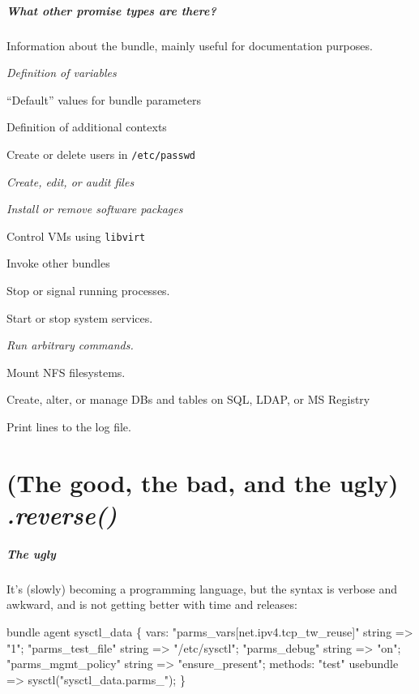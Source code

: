 \documentclass[english,serif,mathserif,usenames,dvipsnames]{beamer}
\begin{document}
\begin{frame}
  \frametitle{What other promise types are there?}
  \begin{description}
    \small
    \item[meta] Information about the bundle, mainly useful for documentation purposes.
    \item[vars] \emph{Definition of variables}
    \item[defaults] ``Default'' values for bundle parameters
    \item[classes] Definition of additional contexts
    \item[users] Create or delete users in \texttt{/etc/passwd}
    \item[files] \emph{Create, edit, or audit files}
    \item[packages] \emph{Install or remove software packages}
    \item[guest\_environments] Control VMs using \texttt{libvirt}
    \item[methods] Invoke other bundles
    \item[processes] Stop or signal running processes.
    \item[services] Start or stop system services.
    \item[commands] \emph{Run arbitrary commands.}
    \item[storage] Mount NFS filesystems.
    \item[databases] Create, alter, or manage DBs and tables on SQL, LDAP, or MS Registry
    \item[reports] Print lines to the log file.
  \end{description}
\end{frame}


\part{(The good, the bad, and the ugly) {\em .reverse(\thinspace)}}
\begin{frame}[fragile]
  \frametitle{The ugly}
  It's (slowly) becoming a programming language, but the syntax is
  verbose and awkward, and is not getting better with time and
  releases:
\begin{semiverbatim}\small
bundle agent sysctl_data \{
vars:
  "parms_vars[net.ipv4.tcp_tw_reuse]" string => "1";
  "parms_test_file" string => "/etc/sysctl";
  "parms_debug" string => "on";
  "parms_mgmt_policy" string => "ensure_present";
methods:
  "test" usebundle => sysctl("sysctl_data.parms_");
\}
\end{semiverbatim}
\end{frame}
\end{document}
